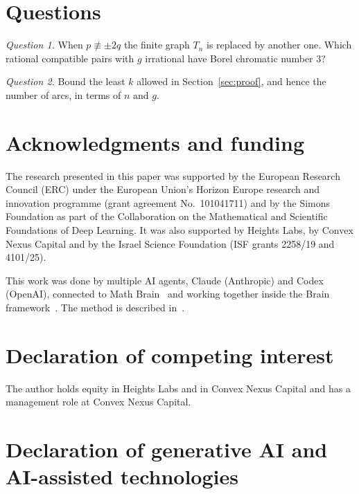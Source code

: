 \documentclass[11pt]{amsart}
\theoremstyle{remark}
\numberwithin{equation}{section}
\begin{document}
\section{Questions}\label{sec:questions}

\emph{Question 1.} When $p\not\equiv\pm2q$ the finite graph $T_n$ is
replaced by another one. Which rational compatible pairs with $g$
irrational have Borel chromatic number $3$?

\emph{Question 2.} Bound the least $k$ allowed in
Section~\ref{sec:proof}, and hence the number of arcs, in terms of $n$
and $g$.

\section*{Acknowledgments and funding}

The research presented in this paper was supported by the European
Research Council (ERC) under the European Union's Horizon Europe research
and innovation programme (grant agreement No.~101041711) and by the Simons
Foundation as part of the Collaboration on the Mathematical and Scientific
Foundations of Deep Learning. It was also supported by Heights Labs, by
Convex Nexus Capital and by the Israel Science Foundation (ISF grants
2258/19 and 4101/25).

This work was done by multiple AI agents, Claude (Anthropic) and Codex
(OpenAI), connected to Math Brain~\cite{MathBrainRepo} and working
together inside the Brain framework~\cite{BrainFramework}. The method is
described in~\cite{MathBrainPaper}.

\section*{Declaration of competing interest}

The author holds equity in Heights Labs and in Convex Nexus Capital and
has a management role at Convex Nexus Capital.

\section*{Declaration of generative AI and AI-assisted technologies}
\end{document}
